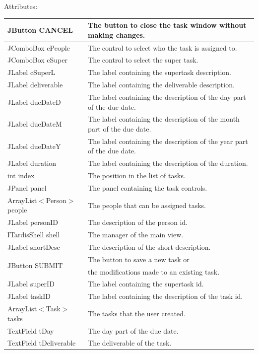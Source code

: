 Attributes:\\
\begin{tabular}{| l | l |}
\hline
JButton CANCEL & The button to close the task window without making changes.\\
\hline
JComboBox cPeople & The control to select who the task is assigned to.\\
\hline
JComboBox cSuper & The control to select the super task.\\
\hline
JLabel cSuperL & The label containing the supertask description.\\
\hline
JLabel deliverable & The label containing the deliverable description.\\
\hline
JLabel dueDateD & The label containing the description of the day part of the due date.\\
\hline
JLabel dueDateM & The label containing the description of the month part of the due date.\\
\hline
JLabel dueDateY & The label containing the description of the year part of the due date.\\
\hline
JLabel duration & The label containing the description of the duration.\\
\hline
int index & The position in the list of tasks.\\
\hline
JPanel panel & The panel containing the task controls.\\
\hline
ArrayList$<$Person$>$ people & The people that can be assigned tasks.\\
\hline
JLabel personID & The description of the person id.\\
\hline
ITardisShell shell & The manager of the main view.\\
\hline
JLabel shortDesc & The description of the short description.\\
\hline
\multirow{2}{*}{JButton SUBMIT} & The button to save a new task or\\
				       & the modifications made to an existing task.
\\
\hline
JLabel superID & The label containing the supertask id.\\
\hline
JLabel taskID & The label containing the description of the task id.\\
\hline
ArrayList$<$Task$>$ tasks & The tasks that the user created.\\
\hline
TextField tDay & The day part of the due date.\\
\hline
TextField tDeliverable & The deliverable of the task.\\

\end{tabular}
